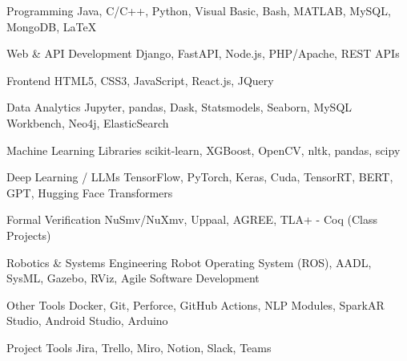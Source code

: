 


\begin{cvskills}


\cvskill
{Programming} %
{Java, C/C++, Python, Visual Basic, Bash, MATLAB, MySQL, MongoDB, LaTeX} %


\cvskill
{Web \& API Development}
{Django, FastAPI, Node.js, PHP/Apache, REST APIs}

\cvskill
{Frontend}
{HTML5, CSS3, JavaScript, React.js, JQuery}


\cvskill
{Data Analytics}
{Jupyter, pandas, Dask, Statsmodels, Seaborn, MySQL Workbench, Neo4j, ElasticSearch}


\cvskill
{Machine Learning Libraries}
{scikit-learn, XGBoost, OpenCV, nltk, pandas, scipy}

\cvskill
{Deep Learning / LLMs}
{TensorFlow, PyTorch, Keras, Cuda, TensorRT, BERT, GPT, Hugging Face Transformers}


\cvskill
{Formal Verification}
{NuSmv/NuXmv, Uppaal, AGREE, TLA+ - Coq (Class Projects)}

\cvskill
{Robotics \& Systems Engineering}
{Robot Operating System (ROS), AADL, SysML, Gazebo, RViz, Agile Software Development}

\cvskill
{Other Tools}
{Docker, Git, Perforce, GitHub Actions, NLP Modules, SparkAR Studio, Android Studio, Arduino}

\cvskill
{Project Tools}
{Jira, Trello, Miro, Notion, Slack, Teams}





\end{cvskills}
